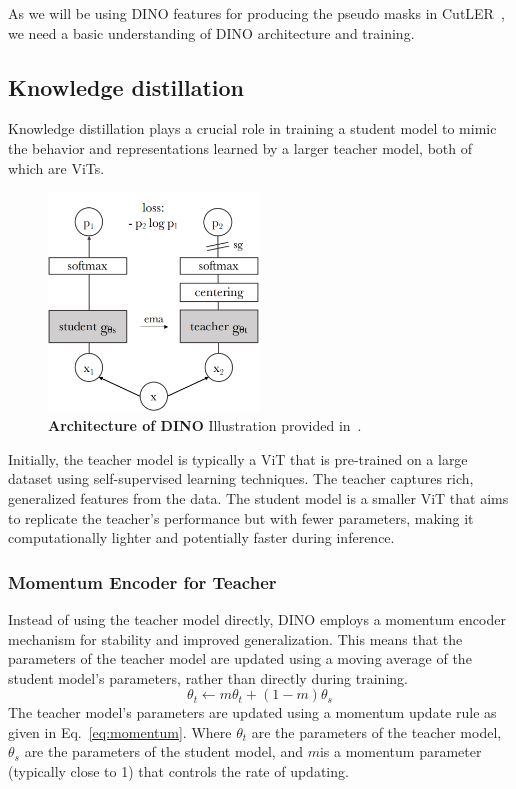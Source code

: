 As we will be using DINO features for producing the pseudo masks in CutLER~\cite{wang2023cut}, we need a basic understanding of DINO architecture and training.

\subsection{Knowledge distillation}
 Knowledge distillation plays a crucial role in training a student model to mimic the behavior and representations learned by a larger teacher model, both of which are ViTs. 
 
\begin{figure}
	\centering
	\includegraphics[width=0.5\textwidth]{Images/main/dino.png}
	\caption[\textbf{DINO Architecture }]{\textbf{Architecture of DINO} Illustration provided in~\cite{caron2021emerging}.}
	\label{fig:dino}
\end{figure} 
 
 Initially, the teacher model is typically a ViT that is pre-trained on a large dataset using self-supervised learning techniques. The teacher captures rich, generalized features from the data. The student model is a smaller ViT that aims to replicate the teacher's performance but with fewer parameters, making it computationally lighter and potentially faster during inference.
 
\subsubsection{Momentum Encoder for Teacher}
Instead of using the teacher model directly, DINO employs a momentum encoder mechanism for stability and improved generalization. This means that the parameters of the teacher model are updated using a moving average of the student model's parameters, rather than directly during training.
\begin{equation}
	\label{eq:momentum}
	\theta_t \leftarrow m \theta_t + (1 - m) \theta_s
\end{equation}
The teacher model's parameters are updated using a momentum update rule as given in Eq.~\ref{eq:momentum}. Where \(\theta_t\) are the parameters of the teacher model, \(\theta_s\) are the parameters of the student model, and \(m\)is a momentum parameter (typically close to 1) that controls the rate of updating.

